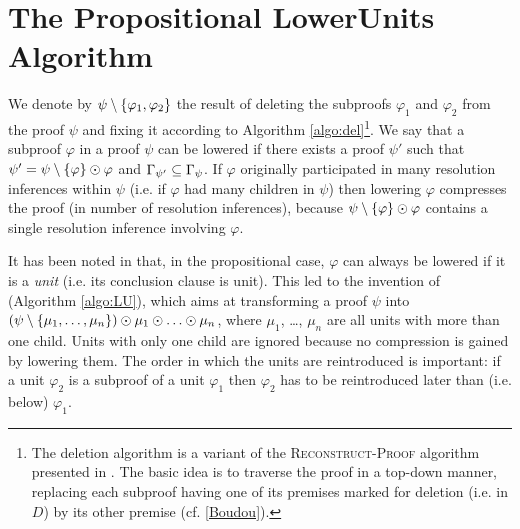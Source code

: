 \clearpage

\section{The Propositional LowerUnits Algorithm}
\label{sec:PropositionalLU}

We denote by $\psi \setminus \{\varphi_1, \varphi_2\}$ the result of deleting the subproofs $\varphi_1$ and $\varphi_2$ from the proof $\psi$ and fixing it according to Algorithm \ref{algo:del}\footnote{
  The deletion algorithm is a variant of the \textsc{Reconstruct-Proof} algorithm presented in \cite{RP11}.
  The basic idea is to traverse the proof in a top-down manner, replacing
  each subproof having one of its premises marked for deletion (i.e. in $D$) by its other premise (cf. \ref{Boudou}).
}. 
We say that a subproof $\varphi$ in a proof $\psi$ can be lowered 
if there exists a proof
$\psi'$ such that $\psi' = \psi \setminus \{\varphi\} \odot \varphi$ and
$\Gamma_{\psi'} \subseteq \Gamma_{\psi}$. If $\varphi$ originally participated in many resolution inferences within $\psi$ (i.e. if $\varphi$ had many children in $\psi$) then lowering $\varphi$ compresses the proof (in number of resolution inferences), because $\psi \setminus \{\varphi\} \odot \varphi$ contains a single resolution inference involving $\varphi$.

%
It has been noted in \cite{LURPI} that, in the propositional case, $\varphi$ can always be lowered if it is a \emph{unit} (i.e. its conclusion clause is unit). This led to the invention of {\LowerUnits} (Algorithm \ref{algo:LU}), which aims at transforming a proof $\psi$ into $(\psi \setminus \{\mu_1,\ldots,\mu_n\}) \odot \mu_1 \odot \ldots \odot \mu_n$, where $\mu_1$, \ldots, $\mu_n$ are all units with more than one child. Units with only one child are ignored because no compression is gained by lowering them. The order in which the units are reintroduced is important:
if a unit $\varphi_2$ is a subproof of a unit
$\varphi_1$ then $\varphi_2$ has to be reintroduced later than (i.e. below) $\varphi_1$.


\newlength\algowd
\def\savewd#1{\setbox0=\hbox{#1\hspace{.7in}}\algowd=\wd0\relax#1}
\newcommand\algolines[2]{\savewd{#1}%
  \tcp*{\parbox[t]{\dimexpr\algowidth-\algowd}{#2}}}



